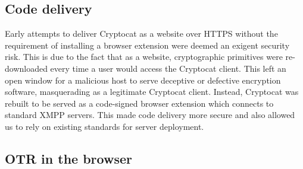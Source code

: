 \documentclass[letterpaper,twocolumn,10pt]{article}
\begin{document}
\subsection{Code delivery}

Early attempts to deliver Cryptocat as a website over HTTPS without the requirement of installing a browser extension were deemed an exigent security risk. This is due to the fact that as a website, cryptographic primitives were re-downloaded every time a user would access the Cryptocat client. This left an open window for a malicious host to serve deceptive or defective encryption software, masquerading as a legitimate Cryptocat client. Instead, Cryptocat was rebuilt to be served as a code-signed browser extension which connects to standard XMPP servers. This made code delivery more secure and also allowed us to rely on existing standards for server deployment.

\subsection{OTR in the browser}
\end{document}
